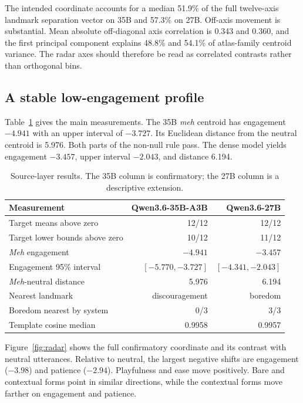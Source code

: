 \documentclass[10pt]{article}
\newcommand{\moemodel}{Qwen3.6-35B-A3B}
\newcommand{\densemodel}{Qwen3.6-27B}
\begin{document}
The intended coordinate accounts for a median 51.9\% of the full twelve-axis
landmark separation vector on 35B and 57.3\% on 27B. Off-axis movement is
substantial. Mean absolute off-diagonal axis correlation is 0.343 and 0.360,
and the first principal component explains 48.8\% and 54.1\% of atlas-family
centroid variance. The radar axes should therefore be read as correlated
contrasts rather than orthogonal bins.

\subsection{A stable low-engagement profile}

Table~\ref{tab:meh} gives the main measurements. The 35B \emph{meh} centroid
has engagement $-4.941$ with an upper interval of $-3.727$. Its Euclidean
distance from the neutral centroid is 5.976. Both parts of the non-null rule
pass. The dense model yields engagement $-3.457$, upper interval $-2.043$, and
distance 6.194.

\begin{table}[!tb]
\centering
\caption{Source-layer results. The 35B column is confirmatory; the 27B column
is a descriptive extension.}
\label{tab:meh}
\begin{tabular}{lrr}
\toprule
Measurement & \moemodel & \densemodel \\
\midrule
Target means above zero & 12/12 & 12/12 \\
Target lower bounds above zero & 10/12 & 11/12 \\
\emph{Meh} engagement & $-4.941$ & $-3.457$ \\
Engagement 95\% interval & $[-5.770,-3.727]$ & $[-4.341,-2.043]$ \\
\emph{Meh}-neutral distance & 5.976 & 6.194 \\
Nearest landmark & discouragement & boredom \\
Boredom nearest by system & 0/3 & 3/3 \\
Template cosine median & 0.9958 & 0.9957 \\
\bottomrule
\end{tabular}
\end{table}

Figure~\ref{fig:radar} shows the full confirmatory coordinate and its contrast
with neutral utterances. Relative to neutral, the largest negative shifts are
engagement ($-3.98$) and patience ($-2.94$). Playfulness and ease move
positively. Bare and contextual forms point in similar directions, while the
contextual forms move farther on engagement and patience.
\end{document}
